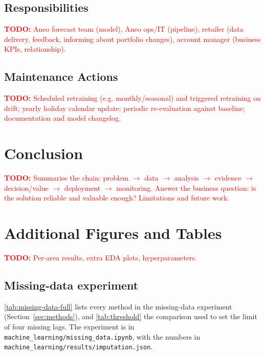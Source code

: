 \documentclass[11pt,a4paper]{article}
\newcommand{\todo}[1]{\textcolor{red}{\textbf{TODO:} #1}}
\begin{document}
\subsection{Responsibilities}
\todo{Aneo forecast team (model), Aneo ops/IT (pipeline), retailer (data delivery, feedback, informing about portfolio changes), account manager (business KPIs, relationship).}

\subsection{Maintenance Actions}
\todo{Scheduled retraining (e.g. monthly/seasonal) and triggered retraining on drift; yearly holiday calendar update; periodic re-evaluation against baseline; documentation and model changelog.}

\section{Conclusion}
\label{sec:conclusion}
\todo{Summarise the chain: problem $\rightarrow$ data $\rightarrow$ analysis $\rightarrow$ evidence $\rightarrow$ decision/value $\rightarrow$ deployment $\rightarrow$ monitoring. Answer the business question: is the solution reliable and valuable enough? Limitations and future work.}

\newpage




\newpage

\appendix
\section{Additional Figures and Tables}
\todo{Per-area results, extra EDA plots, hyperparameters.}

\subsection{Missing-data experiment}
\label{app:missing-data}
\cref{tab:missing-data-full} lists every method in the missing-data experiment (Section~\ref{sec:methods}), and \cref{tab:threshold} the comparison used to set the limit of four missing lags. The experiment is in \texttt{machine\_learning/missing\_data.ipynb}, with the numbers in \texttt{machine\_learning/results/imputation.json}.
\end{document}

